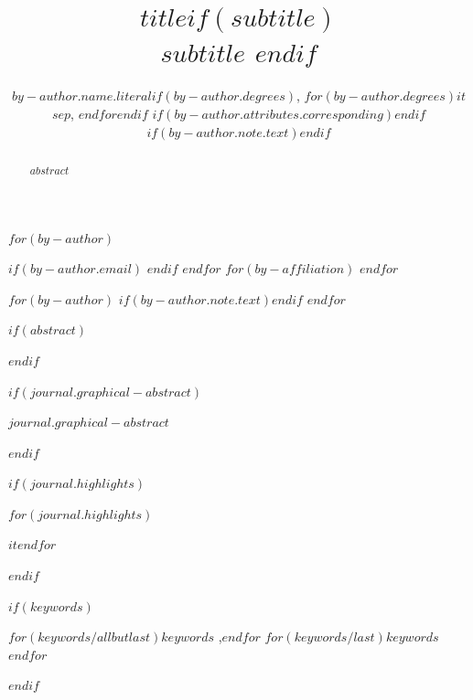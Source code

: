 
\begin{frontmatter}
\title{$title$$if(subtitle)$ \\\large{$subtitle$} $endif$}
$for(by-author)$\author[$for(by-author.affiliations)$$it.number$$sep$,$endfor$]{$by-author.name.literal$$if(by-author.degrees)$, $for(by-author.degrees)$$it$$sep$, $endfor$$endif$%
$if(by-author.attributes.corresponding)$$endif$%
$if(by-author.note.text)$$endif$}
$if(by-author.email)$  $endif$
$endfor$
$for(by-affiliation)$
$endfor$

$for(by-author)$
$if(by-author.note.text)$$endif$
$endfor$
        
$if(abstract)$
\begin{abstract}
$abstract$
\end{abstract}
$endif$

$if(journal.graphical-abstract)$\begin{graphicalabstract}
$journal.graphical-abstract$
\end{graphicalabstract}
$endif$

$if(journal.highlights)$\begin{highlights}
$for(journal.highlights)$\item $it$$endfor$
\end{highlights}
$endif$

$if(keywords)$
\begin{keyword}
    $for(keywords/allbutlast)$$keywords$ \sep $endfor$
    $for(keywords/last)$$keywords$$endfor$
\end{keyword}
$endif$
\end{frontmatter}
    
